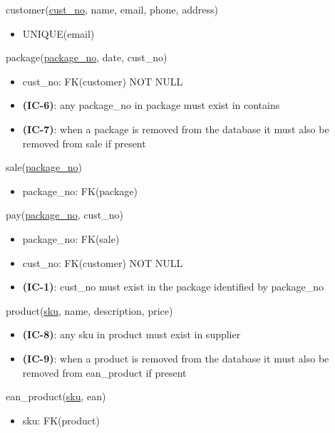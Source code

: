 \documentclass[12pt,a4paper]{article}
\begin{document}
  \ttfamily
  \noindent
  customer(\underline{cust\_no}, name, email, phone, address)
  \begin{itemize}[nosep]
      \item UNIQUE(email)
  \end{itemize}

  \vspace*{10pt}
  \noindent
  package(\underline{package\_no}, date, cust\_no)
  \begin{itemize}[nosep]
      \item cust\_no: FK(customer) NOT NULL
      \item \textsf{\textbf{(IC-6)}}: any package\_no in package \textsf{must exist} in contains
      \item \textsf{\textbf{(IC-7)}}: when a package \textsf{is removed} from the database it \textsf{must also} be removed from sale if present
  \end{itemize}

  \vspace*{10pt}
  \noindent
  sale(\underline{package\_no})
  \begin{itemize}[nosep]
      \item package\_no: FK(package)
  \end{itemize}

  \vspace*{10pt}
  \noindent
  pay(\underline{package\_no}, cust\_no)
  \begin{itemize}[nosep]
      \item package\_no: FK(sale)
      \item cust\_no: FK(customer) NOT NULL
      \item \textsf{\textbf{(IC-1)}}: cust\_no \textsf{must exist} in the package identified by package\_no
  \end{itemize}

  \vspace*{10pt}
  \noindent
  product(\underline{sku}, name, description, price)
  \begin{itemize}[nosep]
      \item \textsf{\textbf{(IC-8)}}: any sku in product \textsf{must exist} in supplier
      \item \textsf{\textbf{(IC-9)}}: when a product \textsf{is removed} from the database it \textsf{must also} be removed from ean\_product if present
  \end{itemize}

  \vspace*{10pt}
  \noindent
  ean\_product(\underline{sku}, ean)
  \begin{itemize}[nosep]
      \item sku: FK(product)
  \end{itemize}
\end{document}
